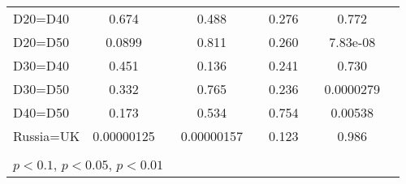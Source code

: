 \begin{tabular}{l|cccccc|cc}
D20=D40         &    0.674         &         &    0.488         &         &    0.276         &         &    0.772         &         \\
D20=D50         &   0.0899         &         &    0.811         &         &    0.260         &         & 7.83e-08         &         \\
D30=D40         &    0.451         &         &    0.136         &         &    0.241         &         &    0.730         &         \\
D30=D50         &    0.332         &         &    0.765         &         &    0.236         &         &0.0000279         &         \\
D40=D50         &    0.173         &         &    0.534         &         &    0.754         &         &  0.00538         &         \\
Russia=UK       &0.00000125         &         &0.00000157         &         &    0.123         &         &    0.986         &         \\
\hline\hline
\multicolumn{9}{p{16cm}}{\tiny }\\
\multicolumn{9}{l}{\tiny \sym{*} \(p<0.1\), \sym{**} \(p<0.05\), \sym{***} \(p<0.01\)}\\
\end{tabular}